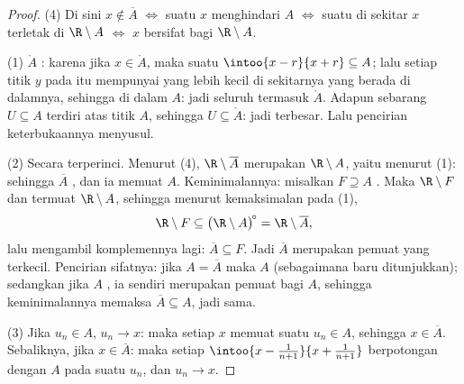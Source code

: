 \begin{proof}
(4) Di sini $x \notin \overline A$ $\iff$ suatu  $x$ menghindari $A$
$\iff$ suatu  di sekitar $x$ terletak di $\R \setminus A$ $\iff$ $x$
bersifat  bagi $\R \setminus A$.

(1)  $\mathring A$ : karena jika $x \in \mathring A$, maka suatu
$\intoo{x-r}{x+r} \subseteq A$; lalu setiap titik $y$ pada  itu mempunyai
 yang lebih kecil di sekitarnya yang berada di dalamnya, sehingga di dalam $A$: jadi seluruh
 termasuk $\mathring A$. Adapun sebarang  $U \subseteq A$ terdiri atas
titik  $A$, sehingga $U \subseteq \mathring A$: jadi terbesar. Lalu
pencirian keterbukaannya menyusul.

(2) Secara terperinci. Menurut (4), $\R \setminus \overline A$ merupakan 
$\R \setminus A$, yaitu  menurut (1): sehingga $\overline A$
, dan ia memuat $A$. Keminimalannya: misalkan $F \supseteq A$
. Maka $\R \setminus F$  dan termuat $\R
\setminus A$, sehingga menurut kemaksimalan pada (1),
\[
\R \setminus F \subseteq \bigl(\R \setminus A\bigr)^{\!\circ}
= \R \setminus \overline A ,
\]
lalu mengambil komplemennya lagi: $\overline A \subseteq F$. Jadi
$\overline A$ merupakan pemuat  yang terkecil. Pencirian sifatnya:
jika $A = \overline A$ maka $A$  (sebagaimana baru ditunjukkan); sedangkan jika $A$
, ia sendiri merupakan pemuat  bagi $A$, sehingga keminimalannya
memaksa $\overline A \subseteq A$, jadi sama.

(3) Jika $u_n \in A$, $u_n \to x$: maka setiap  $x$ memuat
suatu $u_n \in A$, sehingga $x \in \overline A$. Sebaliknya, jika $x \in
\overline A$: maka setiap  $\intoo{x - \frac{1}{n+1}}{x +
\frac{1}{n+1}}$ berpotongan dengan $A$ pada suatu $u_n$, dan $u_n \to x$.
\end{proof}

